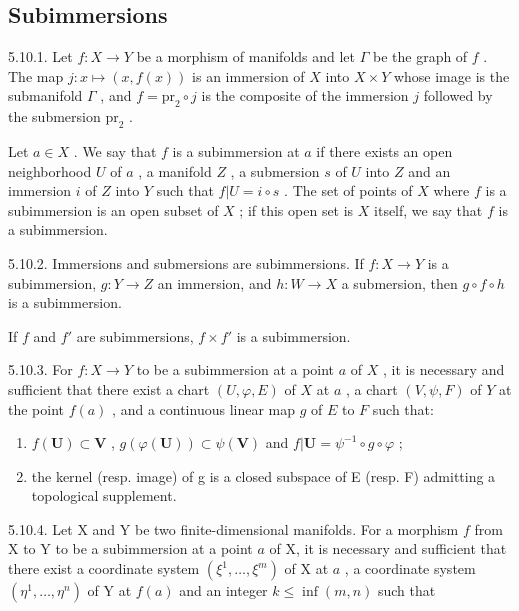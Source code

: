 \subsection{Subimmersions}

5.10.1. Let \(f:X\to Y\) be a morphism of manifolds and let \(\Gamma\) be the graph of \(f\) . The map \(j:x\mapsto(x,f(x))\) is an immersion of \(X\) into \(X\times Y\) whose image is the submanifold \(\Gamma\) , and \(f=\mathrm{pr}_{2}\circ j\) is the composite of the immersion \(j\) followed by the submersion \(\mathrm{pr}_{2}\) .

Let \(a \in X\) . We say that \(f\) is a subimmersion at \(a\) if there exists an open neighborhood \(U\) of \(a\) , a manifold \(Z\) , a submersion \(s\) of \(U\) into \(Z\) and an immersion \(i\) of \(Z\) into \(Y\) such that \(f|U = i \circ s\) . The set of points of \(X\) where \(f\) is a subimmersion is an open subset of \(X\) ; if this open set is \(X\) itself, we say that \(f\) is a subimmersion.

5.10.2. Immersions and submersions are subimmersions. If \(f: X \to Y\) is a subimmersion, \(g: Y \to Z\) an immersion, and \(h: W \to X\) a submersion, then \(g \circ f \circ h\) is a subimmersion.

If \(f\) and \(f'\) are subimmersions, \(f \times f'\) is a subimmersion.

5.10.3. For \(f: X \to Y\) to be a subimmersion at a point \(a\) of \(X\) , it is necessary and sufficient that there exist a chart \((U, \varphi, E)\) of \(X\) at \(a\) , a chart \((V, \psi, F)\) of \(Y\) at the point \(f(a)\) , and a continuous linear map \(g\) of \(E\) to \(F\) such that:

\begin{enumerate}
\def\labelenumi{(\roman{enumi})}
\item
  \(f(\mathbf{U}) \subset \mathbf{V}\) , \(g(\varphi(\mathbf{U})) \subset \psi(\mathbf{V})\) and \(f|\mathbf{U} = \psi^{-1} \circ g \circ \varphi\) ;
\item
  the kernel (resp. image) of g is a closed subspace of E (resp. F) admitting a topological supplement.
\end{enumerate}

5.10.4. Let X and Y be two finite-dimensional manifolds. For a morphism \(f\) from X to Y to be a subimmersion at a point \(a\) of X, it is necessary and sufficient that there exist a coordinate system \((\xi^{1},\ldots,\xi^{m})\) of X at \(a\) , a coordinate system \((\eta^{1},\ldots,\eta^{n})\) of Y at \(f(a)\) and an integer \(k\leqslant\inf(m,n)\) such that

